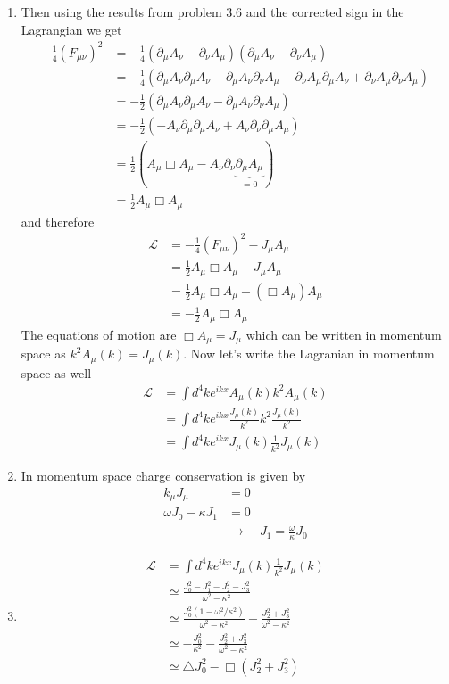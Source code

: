 \documentclass[10pt,a4paper]{book}
\theoremstyle{definition}
\begin{document}
\begin{enumerate}[label=(\alph*)]
\item Then using the results from problem 3.6 and the corrected sign in the Lagrangian we get
\begin{align}
-\frac{1}{4}(F_{\mu\nu})^2
    &=-\frac{1}{4}(\partial_\mu A_\nu-\partial_\nu A_\mu)(\partial_\mu A_\nu-\partial_\nu A_\mu)\\
    &=-\frac{1}{4}\left(\partial_\mu A_\nu \partial_\mu A_\nu-\partial_\mu A_\nu \partial_\nu A_\mu
        -\partial_\nu A_\mu \partial_\mu A_\nu + \partial_\nu A_\mu\partial_\nu A_\mu\right)\\
    &=-\frac{1}{2}\left(\partial_\mu A_\nu \partial_\mu A_\nu-\partial_\mu A_\nu \partial_\nu A_\mu\right)\\
    &=-\frac{1}{2}\left(-A_\nu\partial_\mu\partial_\mu A_\nu+ A_\nu \partial_\nu \partial_\mu A_\mu\right)\\
    &=\frac{1}{2}\left(A_\mu \Box A_\mu- A_\nu \partial_\nu \underbrace{\partial_\mu A_\mu}_{=0}\right)\\ 
    &=\frac{1}{2}A_\mu \Box A_\mu
\end{align}
and therefore
\begin{align}
\mathcal{L}&=-\frac{1}{4}(F_{\mu\nu})^2-J_\mu A_\mu\\
&=\frac{1}{2}A_\mu\Box A_\mu-J_\mu A_\mu\\
&=\frac{1}{2}A_\mu\Box A_\mu-(\Box A_\mu) A_\mu\\
&=-\frac{1}{2}A_\mu\Box A_\mu
\end{align}
The equations of motion are $\Box A_\mu=J_\mu$ which can be written in momentum space as $k^2A_\mu(k)=J_\mu(k)$. Now let's write the Lagranian in momentum space as well
\begin{align}
\mathcal{L}&=\int d^4k e^{ikx}A_\mu(k)k^2A_\mu(k)\\
&=\int d^4k e^{ikx}\frac{J_\mu(k)}{k^2}k^2\frac{J_\mu(k)}{k^2}\\
&=\int d^4k e^{ikx}J_\mu(k)\frac{1}{k^2}J_\mu(k)
\end{align} 
\item In momentum space charge conservation is given by
\begin{align}
  k_\mu J_\mu&=0\\
  \omega J_0-\kappa J_1&=0\\
  &\rightarrow\quad J_1=\frac{\omega}{\kappa}J_0
\end{align}

\item
\begin{align}
\mathcal{L}&=\int d^4k e^{ikx}J_\mu(k)\frac{1}{k^2}J_\mu(k)\\
&\simeq\frac{J_0^2-J_1^2-J_2^2-J_3^2}{\omega^2-\kappa^2}\\
&\simeq\frac{J_0^2(1-\omega^2/\kappa^2)}{\omega^2-\kappa^2}-\frac{J_2^2+J_3^2}{\omega^2-\kappa^2}\\
&\simeq-\frac{J_0^2}{\kappa^2}-\frac{J_2^2+J_3^2}{\omega^2-\kappa^2}\\
&\simeq\triangle J_0^2-\Box(J_2^2+J_3^2)
\end{align} 


\end{enumerate}
\end{document}
